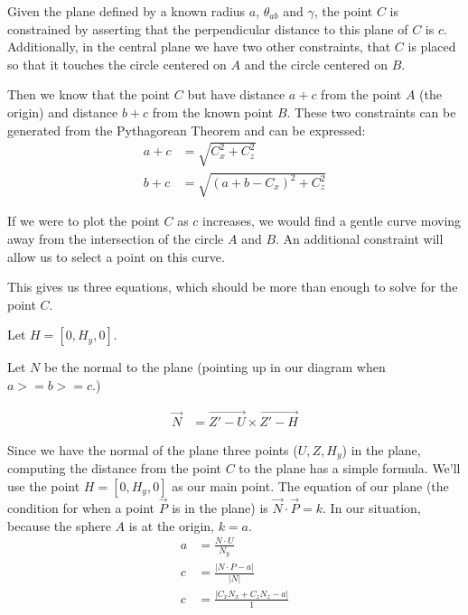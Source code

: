 \documentclass{article}
\begin{document}
\newcommand{\abs}[1]{ \left\lvert#1\right\rvert}

Given the plane defined by a known radius $a$, $\theta_{ab}$ and $\gamma$,
the point $C$ is constrained by asserting that the perpendicular
distance to this plane of $C$ is $c$.
Additionally, in the central plane we have two other constraints,
that $C$ is placed so that it touches the circle centered on $A$ and
the circle centered on $B$.

Then we know that the point $C$ but have distance $a+c$ from
the point $A$ (the origin) and distance $b+c$ from the known
point $B$. These two constraints can be generated from the Pythagorean Theorem and can be expressed:
\begin{align}
a + c &= \sqrt{C_x^2 + C_z ^2} \label{eq:a_constraint}\\
b + c &= \sqrt{(a+b-C_x)^2 + C_z^2} \label{eq:b_constraint}
\end{align}

If we were to plot the point $C$ as $c$ increases, we
would find a gentle curve moving away from the intersection
of the circle $A$ and $B$. An additional constraint will
allow us to select a point on this curve.

This gives us three equations, which
should be more than enough to solve for the point $C$.

Let $H = [0, H_y,0]$.

Let $N$ be the normal to the plane (pointing up in our diagram
when $ a >= b >= c $.)

\begin{align}
\overrightarrow{N} &= \overrightarrow{Z' - U}  \times \overrightarrow{Z' - H}
\end{align}

Since we have the normal of the plane three points ($U,Z,H_y$) in the plane,
computing the distance from the point $C$ to the plane has a simple
formula. We'll use the point $H = [0, H_y, 0]$ as our main point.
The equation of our plane (the condition for when a point $\overrightarrow{P}$ is in the plane) is
$ \overrightarrow{N} \cdot \overrightarrow{P} = k$.
In our situation, because the sphere $A$ is at the origin, $k = a$.
\begin{align}
a &= \frac{N \cdot U}{N_y} \\
c &= \frac{\abs{N \cdot P - a}}{\abs{N}} \\
c &= \frac{\abs{C_x  N_x  + C_z  N_z - a}}{1} \label{eq:c_constraint}
\end{align}
\end{document}
